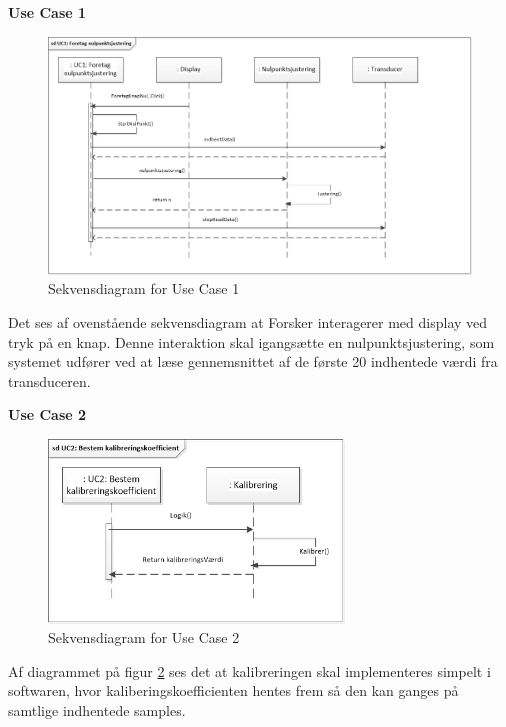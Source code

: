 \textbf{Use Case 1}
\begin{figure}[H]
	\centering
	\includegraphics[width=1.0\textwidth]{Figurer/UC1}
	\caption{Sekvensdiagram for Use Case 1}
	\label{fig:Sekvensdiagram_UC_1}
\end{figure}
Det ses af ovenstående sekvensdiagram at Forsker interagerer med display ved tryk på en knap. Denne interaktion skal igangsætte en nulpunktsjustering, som systemet udfører ved at læse gennemsnittet af de første 20 indhentede værdi fra transduceren. 

\textbf{Use Case 2}
\begin{figure}[H]
	\centering
	\includegraphics[width=0.7\textwidth]{Figurer/UC2}
	\caption{Sekvensdiagram for Use Case 2}
	\label{fig:Sekvensdiagram_UC_2}
\end{figure}
Af diagrammet på figur \ref{fig:Sekvensdiagram_UC_2} ses det at kalibreringen skal implementeres simpelt i softwaren, hvor kaliberingskoefficienten hentes frem så den kan ganges på samtlige indhentede samples.

